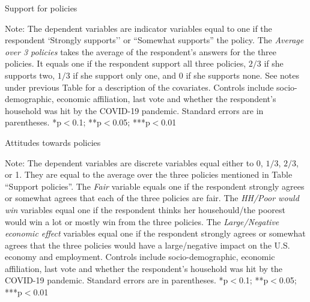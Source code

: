 \documentclass[aspectratio=169,9pt,dvipsnames]{beamer}
\begin{document}
\begin{frame}{}%
\begin{table}[h!]
\caption{Support for policies}
\begin{center}
\scalebox{.7}{}
\end{center}
	{\footnotesize Note: The dependent variables are indicator variables equal to one if the respondent `Strongly supports'' or ``Somewhat supports'' the policy. The \textit{Average over 3 policies} takes the average of the respondent's answers for the three policies. It equals one if the respondent support all three policies, $2/3$ if she supports two, $1/3$ if she support only one, and 0 if she supports none. See notes under previous Table for a description of the covariates.
	\newline Controls include socio-demographic, economic affiliation, last vote and whether the respondent's household was hit by the COVID-19 pandemic. Standard errors are in parentheses. *p$<$0.1; **p$<$0.05; ***p$<$0.01}
\end{table}
\end{frame}

\begin{frame}{}%
\begin{table}[h!]
\caption{Attitudes towards policies}
\begin{center}
\scalebox{.7}{}
\end{center}
	{\scriptsize Note: The dependent variables are discrete variables equal either to 0, $1/3$, $2/3$, or 1. They are equal to the average over the three policies mentioned in Table ``Support policies''. The \textit{Fair} variable equals one if the respondent strongly agrees or somewhat agrees that each of the three policies are fair. The \textit{HH/Poor would win} variables equal one if the respondent thinks her househould/the poorest would win a lot or mostly win from the three policies. The \textit{Large/Negative economic effect} variables equal one if the respondent strongly agrees or somewhat agrees that the three policies would have a large/negative impact on the U.S. economy and employment. 
	\newline Controls include socio-demographic, economic affiliation, last vote and whether the respondent's household was hit by the COVID-19 pandemic. Standard errors are in parentheses. *p$<$0.1; **p$<$0.05; ***p$<$0.01}
\end{table}
\end{frame}
\end{document}
